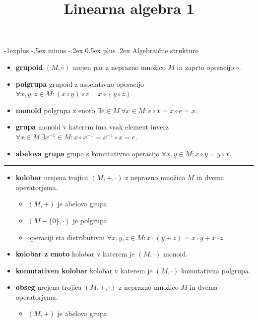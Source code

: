 \documentclass[a4paper,8pt]{extarticle}
\title{Linearna algebra 1}
\makeatletter
\renewcommand{\subsection}{\@startsection{subsection}{2}{0mm}%
                                {-1explus -.5ex minus -.2ex}%
                                {0.5ex plus .2ex}%
                                {\normalfont\normalsize\bfseries}}
\makeatother
\begin{document}
\raggedright
\footnotesize

\begin{multicols}{3}
\setlength{\premulticols}{1pt}
\setlength{\postmulticols}{1pt}
\setlength{\multicolsep}{1pt}
\setlength{\columnsep}{2pt}

\subsection{Algebraične strukture}

\begin{itemize}
    \item \textbf{grupoid} $(M, \circ)$ urejen par z neprazno množico $M$ in zaprto opreacijo $\circ$.
    \item \textbf{polgrupa} grupoid z asociativno operacijo $ \forall x,y,z \in M : (x\circ y)\circ z = x\circ (y\circ z)$.
    \item \textbf{monoid} polgrupa z enoto $ \exists e \in M \ \forall x \in M : e\circ x = x\circ e = x$.
    \item \textbf{grupa} monoid v katerem ima vsak element inverz $ \forall x \in M \ \exists x^{-1} \in M : x\circ x^{-1} = x^{-1}\circ x = e$.
    \item \textbf{abelova grupa} grupa s komutativno operacijo $ \forall x,y \in M  : x\circ y = y\circ x$.
\end{itemize} 
\noindent\rule{2cm}{0.4pt}
\begin{itemize}
    \item \textbf{kolobar} urejena trojica $(M, +, \cdot)$ z neprazno množico $M$ in dvema operatorjema.
    \begin{itemize}
        \item $(M,+)$ je abelova grupa
        \item $(M-\{0\},\cdot)$ je polgrupa
        \item operaciji sta distributivni $\forall x,y,z \in M : x\cdot (y+z) = x\cdot y + x \cdot z$
    \end{itemize}
    \item \textbf{kolobar z enoto} kolobar v katerem je $(M, \cdot)$ monoid.
    \item \textbf{komutativen kolobar} kolobar v katerem je $(M, \cdot)$ komutativna polgrupa.
    \item \textbf{obseg} urejena trojica $(M, +, \cdot)$ z neprazno množico $M$ in dvema operatorjema.
    \begin{itemize}
        \item $(M,+)$ je abelova grupa

\end{itemize}
\end{itemize}
\end{multicols}
\end{document}
